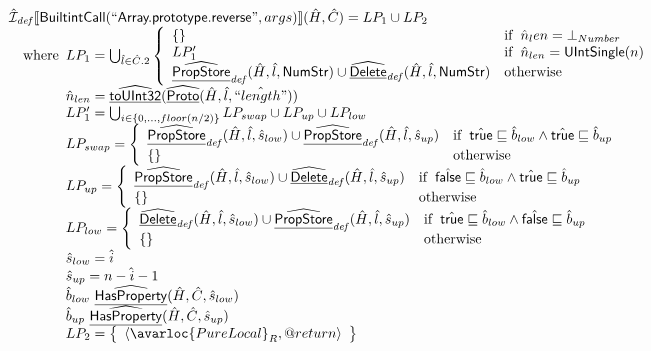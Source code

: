 \[\begin{array}{l}
\aI_{\it def}\lbr \SF{BuiltintCall}(``\SF{Array.prototype.reverse}",args)\rbr(\hat{H},\hat{C}) = LP_1 \cup LP_2\\
\quad\wherec{
  LP_1 = \bigcup_{\hat{l} \in \hat{C}.2} \left\{\begin{array}{ll}
      \set{} & \ifc{\hat{n}_len = \bot_{Number}}\\
      LP_1' & \ifc{\hat{n}_{len} = \SF{UIntSingle}(n)}\\
      \ahf{PropStore}_{\it def}(\hat{H}, \hat{l}, \SF{NumStr}) \cup
        \ahf{Delete}_{\it def}(\hat{H}, \hat{l}, \SF{NumStr}) & \owc
    \end{array}\right.\\
  \hat{n}_{len} = \ahf{toUInt32}(\ahf{Proto}(\hat{H}, \hat{l}, \hat{``length"}))\\    
  LP_1' = \bigcup_{i \in \{0, ..., floor(n/2)\} } LP_{swap} \cup LP_{up} \cup LP_{low}\\
  LP_{swap} = \left\{\begin{array}{ll}
      \ahf{PropStore}_{\it def}(\hat{H}, \hat{l}, \hat{s}_{low}) \cup \ahf{PropStore}_{\it def}(\hat{H}, \hat{l}, \hat{s}_{up}) 
      & \ifc{\atrue \sqsubseteq \hat{b}_{low} \land \atrue \sqsubseteq \hat{b}_{up} }\\
      \set{} & \owc
    \end{array}\right.\\
   LP_{up} = \left\{\begin{array}{ll}
      \ahf{PropStore}_{\it def}(\hat{H}, \hat{l}, \hat{s}_{low}) \cup \ahf{Delete}_{\it def}(\hat{H}, \hat{l}, \hat{s}_{up}) 
      & \ifc{\afalse \sqsubseteq \hat{b}_{low} \land \atrue \sqsubseteq \hat{b}_{up} }\\
      \set{} & \owc
    \end{array}\right.\\
  LP_{low} = \left\{\begin{array}{ll}
      \ahf{Delete}_{\it def}(\hat{H}, \hat{l}, \hat{s}_{low}) \cup \ahf{PropStore}_{\it def}(\hat{H}, \hat{l}, \hat{s}_{up}) 
      & \ifc{\atrue \sqsubseteq \hat{b}_{low} \land \afalse \sqsubseteq \hat{b}_{up} }\\
      \set{} & \owc
    \end{array}\right.\\
  \hat{s}_{low} = \hat{i}\\
  \hat{s}_{up} = \hat{n-i-1}\\
  \hat{b}_{low} \ \ahf{HasProperty}(\hat{H},\hat{C},\hat{s}_{low})\\
  \hat{b}_{up} \ \ahf{HasProperty}(\hat{H},\hat{C},\hat{s}_{up})\\
  LP_2 = \set{\langle\avarloc{PureLocal}_R,\varprop{return}\rangle}\\
  }\\
\\



\end{array}\]
